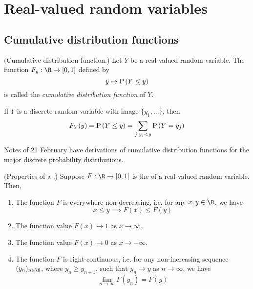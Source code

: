 \documentclass[11pt]{article}
\begin{document}
\section{Real-valued random variables}

\subsection{Cumulative distribution functions}

\begin{defn}{(Cumulative distribution function.)}
    \label{def:cdf}
    Let $Y$ be a real-valued random variable.
    The function $F_y : \R \to [0, 1]$ defined by
    \begin{equation}
        \label{eq:cdf}
        y \mapsto \P{Y \leq y}
    \end{equation}
    is called the \emph{cumulative distribution function} of $Y$.
\end{defn}

\begin{rem}
    If $Y$ is a discrete random variable with image $\{y_1, \ldots\}$,
    then
    \begin{equation*}
        F_Y(y)
        = \P{Y \leq y}
        = \sum_{j : y_j < y} {
            \P{Y = y_j}
        }
    \end{equation*}
\end{rem}

Notes of 21 February have derivations of cumulative distribution functions for
the major discrete probability distributions.

\begin{thm}{(Properties of a \cdf.)}
    \label{thm:cdf-properties}
    Suppose $F : \R \to \unit$ is the \cdf{} of a real-valued random variable.
    Then,
    \begin{enumerate}
        \item
            The function $F$ is everywhere non-decreasing,
            i.e. for any $x, y \in \R$, we have
            \begin{equation*}
                x \leq y \implies F(x) \leq F(y)
            \end{equation*}
        \item
            The function value $F(x) \to 1$ as $x \to \infty$.
        \item
            The function value $F(x) \to 0$ as $x \to -\infty$.
        \item
            The function $F$ is right-continuous, i.e.
            for any non-increasing sequence $(y_n)_{n\in\N}$,
            where $y_n \geq y_{n+1}$, such that $y_n \to y$ as $n \to \infty$,
            we have
            \begin{equation}
                \label{eq:cdf-is-right-continuous}
                \lim_{n\to\infty} F(y_n) = F(y)
            \end{equation}
    \end{enumerate}
\end{thm}
\end{document}
